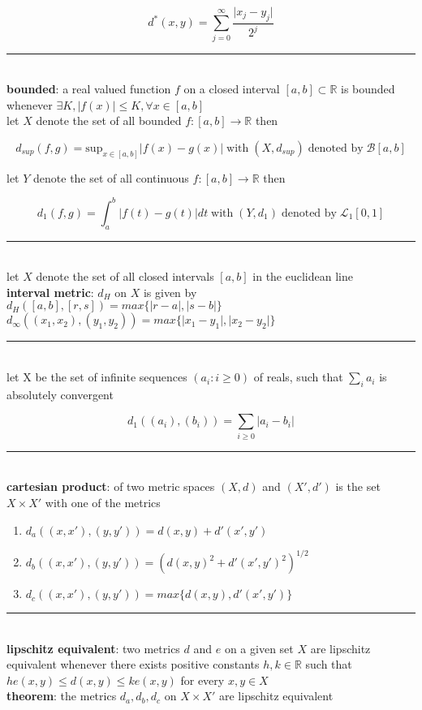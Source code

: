 \documentclass[a4paper]{article}
\newcommand*\abs[1]{\vert #1 \vert}
\newcommand*\linesep[0]{\noindent\rule{\textwidth}{0.5pt}\\}
\begin{document}
\begin{framed}
	$$d^*(x, y) = \sum_{j=0}^\infty \frac{\abs{x_j - y_j}}{2^j}$$
	
	\linesep
	\noindent
	\textbf{bounded}: a real valued function $f$ on a closed interval $[a, b] \subset \mathbb{R}$ is bounded whenever $\exists K, \abs{f(x)} \leq K, \forall x \in [a, b]$\\
	
	\noindent
	let $X$ denote the set of all bounded $f: [a, b] \rightarrow \mathbb{R}$ then
	
	$$d_{sup}(f, g) = \text{sup}_{x \in [a, b]} \abs{f(x) - g(x)} \; \text{with} \; (X, d_{sup}) \; \text{denoted by} \; \mathcal{B}[a, b]$$
	
	\newpage
	\noindent
	let $Y$ denote the set of all continuous $f: [a, b] \rightarrow \mathbb{R}$ then
	
	$$d_1(f, g) = \int_a^b \abs{f(t) - g(t)} dt \; \text{with} \; (Y, d_1) \; \text{denoted by} \; \mathcal{L}_1[0, 1]$$
	
	\linesep
	\noindent
	let $X$ denote the set of all closed intervals $[a, b]$ in the euclidean line\\
	
	\noindent
	\textbf{interval metric}: $d_H$ on $X$ is given by $d_H([a, b], [r, s]) = max\{\abs{r-a}, \abs{s-b}\}$\\
	
	\noindent
	$d_\infty((x_1, x_2), (y_1, y_2)) = max\{\abs{x_1 - y_1}, \abs{x_2 - y_2}\}$
	
	\linesep
	let X be the set of infinite sequences $(a_i : i \geq 0)$ of reals, such that $\sum_i a_i$ is absolutely convergent
	
	$$d_1((a_i), (b_i)) = \sum_{i \geq 0} \abs{a_i - b_i}$$
	
	\linesep
	\textbf{cartesian product}: of two metric spaces $(X, d)$ and $(X', d')$ is the set $X \times X'$ with one of the metrics
	\begin{enumerate}
		\item $d_a((x, x'), (y, y')) = d(x, y) + d'(x', y')$
		\item $d_b((x, x'), (y, y')) = (d(x, y)^2 + d'(x', y')^2)^{1/2}$
		\item $d_c((x, x'), (y, y')) = max\{d(x, y), d'(x', y')\}$
	\end{enumerate}
	
	\linesep
	\noindent
	\textbf{lipschitz equivalent}: two metrics $d$ and $e$ on a given set $X$ are lipschitz equivalent whenever there exists positive constants $h, k \in \mathbb{R}$ such that $he(x, y) \leq d(x, y) \leq ke(x, y)$ for every $x, y \in X$\\
	
	\noindent
	\textbf{theorem}: the metrics $d_a, d_b, d_c$ on $X \times X'$ are lipschitz equivalent
\end{framed}
\end{document}
